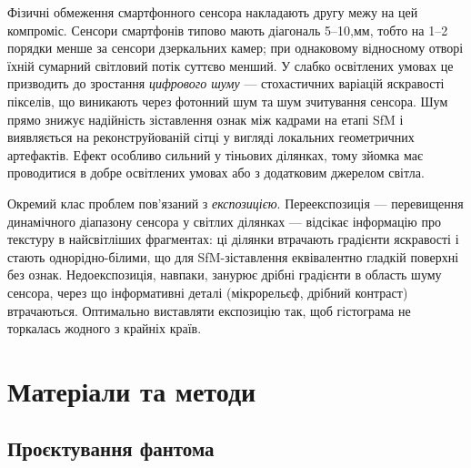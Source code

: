 \documentclass[
  ukrainian,
  10pt,
  a4paper,
  twocolumn]{article}
\begin{document}
Фізичні обмеження смартфонного сенсора накладають другу межу на цей
компроміс. Сенсори смартфонів типово мають діагональ 5--10,мм, тобто на
1--2 порядки менше за сенсори дзеркальних камер; при однаковому
відносному отворі їхній сумарний світловий потік суттєво менший. У
слабко освітлених умовах це призводить до зростання \emph{цифрового
шуму} --- стохастичних варіацій яскравості пікселів, що виникають через
фотонний шум та шум зчитування сенсора. Шум прямо знижує надійність
зіставлення ознак між кадрами на етапі SfM і виявляється на
реконструйованій сітці у вигляді локальних геометричних артефактів.
Ефект особливо сильний у тіньових ділянках, тому зйомка має проводитися
в добре освітлених умовах або з додатковим джерелом світла.

Окремий клас проблем пов'язаний з \emph{експозицією}. Переекспозиція ---
перевищення динамічного діапазону сенсора у світлих ділянках ---
відсікає інформацію про текстуру в найсвітліших фрагментах: ці ділянки
втрачають градієнти яскравості і стають однорідно-білими, що для
SfM-зіставлення еквівалентно гладкій поверхні без ознак. Недоекспозиція,
навпаки, занурює дрібні градієнти в область шуму сенсора, через що
інформативні деталі (мікрорельєф, дрібний контраст) втрачаються.
Оптимально виставляти експозицію так, щоб гістограма не торкалась
жодного з крайніх країв.

\FloatBarrier

\section{Матеріали та
методи}\label{ux43cux430ux442ux435ux440ux456ux430ux43bux438-ux442ux430-ux43cux435ux442ux43eux434ux438}

\subsection{Проєктування
фантома}\label{ux43fux440ux43eux454ux43aux442ux443ux432ux430ux43dux43dux44f-ux444ux430ux43dux442ux43eux43cux430}
\end{document}
